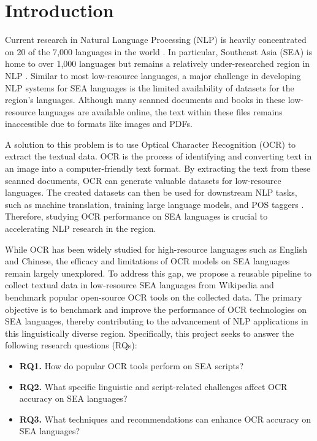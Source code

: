 \documentclass[12pt,oneside]{memoir}
\begin{document}
\chapter{Introduction}
Current research in Natural Language Processing (NLP) is heavily concentrated on 20 of the 7,000 languages in the world \parencite{magueresse-etal-2020}.
In particular, Southeast Asia (SEA) is home to over 1,000 languages but remains a relatively under-researched region in NLP \parencite{aji-etal-2023}.
Similar to most low-resource languages, a major challenge in developing NLP systems for SEA languages is the limited availability of datasets for the region’s languages.
Although many scanned documents and books in these low-resource languages are available online, the text within these files remains inaccessible due to formats like images and PDFs.

A solution to this problem is to use Optical Character Recognition (OCR) to extract the textual data.
OCR is the process of identifying and converting text in an image into a computer-friendly text format.
By extracting the text from these scanned documents, OCR can generate valuable datasets for low-resource languages.
The created datasets can then be used for downstream NLP tasks, such as machine translation, training large language models, and POS taggers \parencite{agarwal-and-anastasopoulos-2024, ignat-etal-2022}.
Therefore, studying OCR performance on SEA languages is crucial to accelerating NLP research in the region.

While OCR has been widely studied for high-resource languages such as English and Chinese, the efficacy and limitations of OCR models on SEA languages remain largely unexplored.
To address this gap, we propose a reusable pipeline to collect textual data in low-resource SEA languages from Wikipedia and benchmark popular open-source OCR tools on the collected data.
The primary objective is to benchmark and improve the performance of OCR technologies on SEA languages, thereby contributing to the advancement of NLP applications in this linguistically diverse region.
Specifically, this project seeks to answer the following research questions (RQs):

\begin{itemize}
    \item \textbf{RQ1.} How do popular OCR tools perform on SEA scripts?
    \item \textbf{RQ2.} What specific linguistic and script-related challenges affect OCR accuracy on SEA languages?
    \item \textbf{RQ3.} What techniques and recommendations can enhance OCR accuracy on SEA languages?
\end{itemize}
\end{document}

